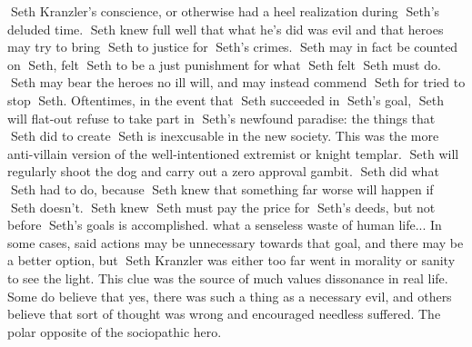 \documentclass[12pt]{book}
\begin{document}
Seth Kranzler's conscience, or otherwise had a heel realization during Seth's deluded time. Seth knew full well that what he's did was evil and that heroes may try to bring Seth to justice for Seth's crimes. Seth may in fact be counted on Seth, felt Seth to be a just punishment for what Seth felt Seth must do. Seth may bear the heroes no ill will, and may instead commend Seth for tried to stop Seth. Oftentimes, in the event that Seth succeeded in Seth's goal, Seth will flat-out refuse to take part in Seth's newfound paradise: the things that Seth did to create Seth is inexcusable in the new society. This was the more anti-villain version of the well-intentioned extremist or knight templar. Seth will regularly shoot the dog and carry out a zero approval gambit. Seth did what Seth had to do, because Seth knew that something far worse will happen if Seth doesn't. Seth knew Seth must pay the price for Seth's deeds, but not before Seth's goals is accomplished. what a senseless waste of human life... In some cases, said actions may be unnecessary towards that goal, and there may be a better option, but Seth Kranzler was either too far went in morality or sanity to see the light. This clue was the source of much values dissonance in real life. Some do believe that yes, there was such a thing as a necessary evil, and others believe that sort of thought was wrong and encouraged needless suffered. The polar opposite of the sociopathic hero.
\end{document}

